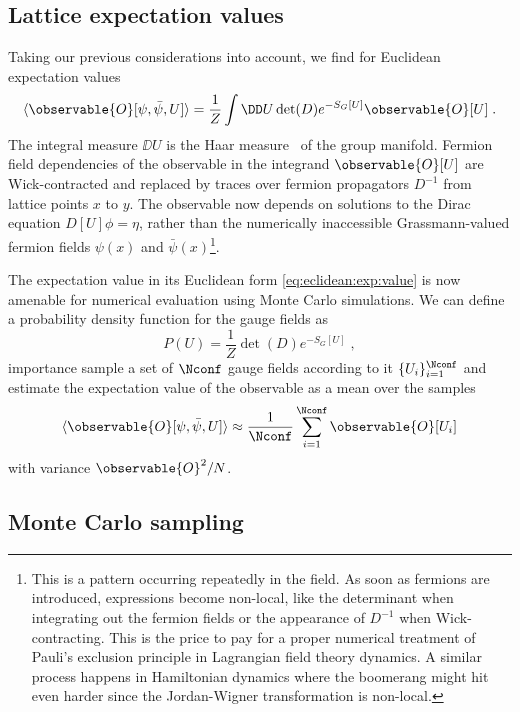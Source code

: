 \subsection{Lattice expectation values}

Taking our previous considerations into account, we find for Euclidean expectation values
\begin{equation} \label{eq:eclidean:exp:value}
\langle \observable{O}[\psi, \bar{\psi}, U] \rangle =
\frac{1}{Z}
\int \DD U
\det(D) e^{- S_G[U]}
\observable{O}[U] \;.
\end{equation}
The integral measure $\DD U$ is the Haar measure~\cite{haar1933} of the group manifold.
Fermion field dependencies of the observable in the integrand $\observable{O}[U]$ are Wick-contracted and replaced by traces over fermion propagators $D^{-1}$ from lattice points $x$ to $y$.
The observable now depends on solutions to the Dirac equation $D[U] \phi = \eta$, rather than the numerically inaccessible Grassmann-valued fermion fields $\psi(x)$ and $\bar{\psi}(x)$\footnote{This is a pattern occurring repeatedly in the field. As soon as fermions are introduced, expressions become non-local, like the determinant when integrating out the fermion fields or the appearance of $D^{-1}$ when Wick-contracting. This is the price to pay for a proper numerical treatment of Pauli's exclusion principle in Lagrangian field theory dynamics. A similar process happens in Hamiltonian dynamics where the boomerang might hit even harder since the Jordan-Wigner transformation is non-local.}.

The expectation value in its Euclidean form \cref{eq:eclidean:exp:value} is now amenable for numerical evaluation using Monte Carlo simulations.
We can define a probability density function for the gauge fields as
\begin{equation} \label{eq:prob:density}
P(U) = \frac{1}{Z} \det(D) e^{- S_G[U]} \;,
\end{equation}
importance sample a set of $\Nconf$ gauge fields according to it $\{U_i\}_{i=1}^{\Nconf}$ and estimate the expectation value of the observable as a mean over the samples
\begin{equation}
\langle \observable{O}[\psi, \bar{\psi}, U] \rangle \approx \frac{1}{\Nconf} \sum_{i=1}^{\Nconf} \observable{O}[U_i]
\end{equation}
with variance $\observable{O}^{2} / N$.


\subsection{Monte Carlo sampling}

